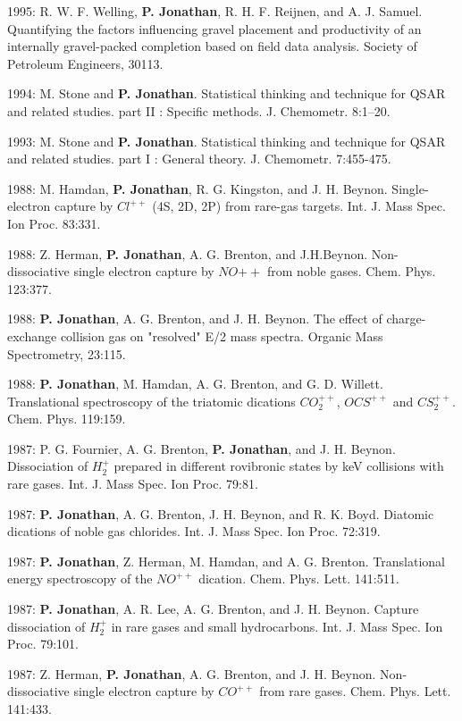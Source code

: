 \documentclass[11pt,a4paper]{moderncv}
\begin{document}
1995: R. W. F. Welling, \textbf{P. Jonathan}, R. H. F. Reijnen, and A. J. Samuel. Quantifying the factors influencing gravel placement and productivity of an internally gravel-packed completion based on field data analysis. Society of Petroleum Engineers, 30113.

1994: M. Stone and \textbf{P. Jonathan}. Statistical thinking and technique for QSAR and related studies. part II : Specific methods. J. Chemometr. 8:1--20.

1993: M. Stone and \textbf{P. Jonathan}. Statistical thinking and technique for QSAR and related studies. part I : General theory. J. Chemometr. 7:455-475.

1988: M. Hamdan, \textbf{P. Jonathan}, R. G. Kingston, and J. H. Beynon. Single-electron capture by $Cl^{++}$ (4S, 2D, 2P) from rare-gas targets. Int. J. Mass Spec. Ion Proc. 83:331.

1988: Z. Herman, \textbf{P. Jonathan}, A. G. Brenton, and J.H.Beynon. Non-dissociative single electron capture by $NO{++}$ from noble gases. Chem. Phys. 123:377.

1988: \textbf{P. Jonathan}, A. G. Brenton, and J. H. Beynon. The effect of charge-exchange collision gas on "resolved" E/2 mass spectra. Organic Mass Spectrometry, 23:115.

1988: \textbf{P. Jonathan}, M. Hamdan, A. G. Brenton, and G. D. Willett. Translational spectroscopy of the triatomic dications $CO_2^{++}$, $OCS^{++}$ and $CS_2^{++}$. Chem. Phys. 119:159.

1987: P. G. Fournier, A. G. Brenton, \textbf{P. Jonathan}, and J. H. Beynon. Dissociation of $H_2^+$ prepared in different rovibronic states by keV collisions with rare gases. Int. J. Mass Spec. Ion Proc. 79:81.

1987: \textbf{P. Jonathan}, A. G. Brenton, J. H. Beynon, and R. K. Boyd. Diatomic dications of noble gas chlorides. Int. J. Mass Spec. Ion Proc. 72:319.

1987: \textbf{P. Jonathan}, Z. Herman, M. Hamdan, and A. G. Brenton. Translational energy spectroscopy of the $NO^{++}$ dication. Chem. Phys. Lett. 141:511.

1987: \textbf{P. Jonathan}, A. R. Lee, A. G. Brenton, and J. H. Beynon. Capture dissociation of $H_2^+$ in rare gases and small hydrocarbons. Int. J. Mass Spec. Ion Proc. 79:101.

1987: Z. Herman, \textbf{P. Jonathan}, A. G. Brenton, and J. H. Beynon. Non-dissociative single electron capture by $CO^{++}$ from rare gases. Chem. Phys. Lett. 141:433.
\end{document}
